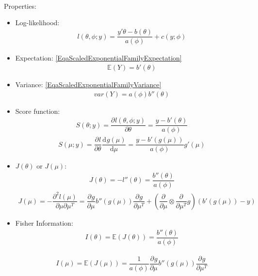 Properties:
\begin{itemize}[topsep=2pt,itemsep=0pt]
    \item Log-likelihood:
    \begin{align}
        l(\theta ,\phi ;y) =\dfrac{y'\theta -b(\theta )}{a(\phi)}+c(y;\phi )
    \end{align}
    
    \item Expectation: \autoref{EqaScaledExponentialFamilyExpectation}
    \begin{align}
        \mathbb{E}(Y)=b'(\theta )
    \end{align}
    \item Variance: \autoref{EqaScaledExponentialFamilyVariance}
    \begin{align}
         var(Y)=a(\phi )b''(\theta )
    \end{align}

    \item Score function:
    \begin{align}
         S(\theta ;y)=\dfrac{\partial^{} l(\theta ,\phi ;y)}{\partial \theta ^{}}= \dfrac{y-b'(\theta )}{a(\phi )}
    \end{align}
    \begin{align}
        S(\mu ;y)=\dfrac{\partial^{} l}{\partial \theta ^{}}\dfrac{\mathrm{d}^{} g(\mu )}{\mathrm{d}\mu ^{}}=\dfrac{y-b'(g(\mu ))}{a(\phi )}g'(\mu ) 
    \end{align}
    
    \item $ J(\theta ) $ or $ J(\mu ) $:
    \begin{align}
        J(\theta )=-l''(\theta )= \dfrac{b''(\theta )}{a(\phi )}
    \end{align}
    \begin{align}
        J(\mu )=-\dfrac{\partial^{2}l(\mu ) }{\partial \mu \partial \mu ^T}=\dfrac{\partial^{} g}{\partial \mu ^{}}b''(g(\mu ))\dfrac{\partial^{} g}{\partial \mu ^T}+\left( \dfrac{\partial^{} }{\partial \mu }\otimes \dfrac{\partial^{} }{\partial \mu ^T}  g\right)(b'(g(\mu ))-y)
    \end{align}
  
    \item Fisher Information:
    \begin{align}
        I(\theta )=\mathbb{E}(J(\theta ))=\dfrac{b''(\theta )}{a(\phi )}
    \end{align}
    
    \begin{align}
        I(\mu )=\mathbb{E}(J(\mu ))= \dfrac{1}{a(\phi )}\dfrac{\partial^{} g}{\partial \mu ^{}}b''(g(\mu ))\dfrac{\partial^{} g}{\partial \mu ^T}
    \end{align}
    
\end{itemize}

